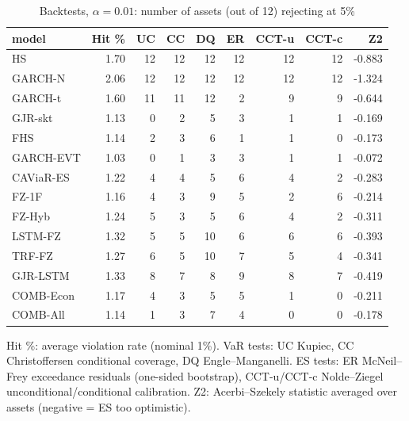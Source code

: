 \begin{table}[htbp]
\centering
\footnotesize
\caption{Backtests, $\alpha=0.01$: number of assets (out of 12) rejecting at 5\%}
\label{tab:bt_a010}
\begin{tabular}{lrrrrrrrr}
\toprule
model & Hit \% & UC & CC & DQ & ER & CCT-u & CCT-c & Z2 \\
\midrule
HS & 1.70 & 12 & 12 & 12 & 12 & 12 & 12 & -0.883 \\
GARCH-N & 2.06 & 12 & 12 & 12 & 12 & 12 & 12 & -1.324 \\
GARCH-t & 1.60 & 11 & 11 & 12 & 2 & 9 & 9 & -0.644 \\
GJR-skt & 1.13 & 0 & 2 & 5 & 3 & 1 & 1 & -0.169 \\
FHS & 1.14 & 2 & 3 & 6 & 1 & 1 & 0 & -0.173 \\
GARCH-EVT & 1.03 & 0 & 1 & 3 & 3 & 1 & 1 & -0.072 \\
CAViaR-ES & 1.22 & 4 & 4 & 5 & 6 & 4 & 2 & -0.283 \\
FZ-1F & 1.16 & 4 & 3 & 9 & 5 & 2 & 6 & -0.214 \\
FZ-Hyb & 1.24 & 5 & 3 & 5 & 6 & 4 & 2 & -0.311 \\
LSTM-FZ & 1.32 & 5 & 5 & 10 & 6 & 6 & 6 & -0.393 \\
TRF-FZ & 1.27 & 6 & 5 & 10 & 7 & 5 & 4 & -0.341 \\
GJR-LSTM & 1.33 & 8 & 7 & 8 & 9 & 8 & 7 & -0.419 \\
COMB-Econ & 1.17 & 4 & 3 & 5 & 5 & 1 & 0 & -0.211 \\
COMB-All & 1.14 & 1 & 3 & 7 & 4 & 0 & 0 & -0.178 \\
\bottomrule
\end{tabular}
\par\smallskip\parbox{\linewidth}{\scriptsize Hit \%: average violation rate (nominal 1\%). VaR tests: UC Kupiec, CC Christoffersen conditional coverage, DQ Engle--Manganelli. ES tests: ER McNeil--Frey exceedance residuals (one-sided bootstrap), CCT-u/CCT-c Nolde--Ziegel unconditional/conditional calibration. Z2: Acerbi--Szekely statistic averaged over assets (negative = ES too optimistic).}
\end{table}
